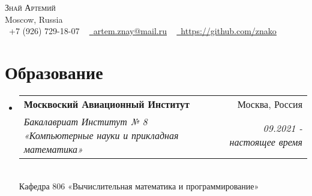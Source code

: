 \documentclass[letterpaper,10pt]{article}
\makeatletter
\newcommand{\resumeSubheading}[4]{
  \vspace{-1pt}\item
    \begin{tabular*}{0.97\textwidth}{l@{\extracolsep{\fill}}r}
      \textbf{#1} & \textcolor{mygray}{#2} \\
      \textit{\small#3} & \textcolor{mygray}{\textit{\small #4}} \\
    \end{tabular*}\vspace{-5pt}
}
\newcommand{\resumeSubHeadingListStart}{\begin{itemize}[leftmargin=*]}
\newcommand{\resumeSubHeadingListEnd}{\end{itemize}}
\makeatother
\begin{document}
\begin{center}
    {\huge \scshape Знай Артемий} \\ \vspace{1pt}
    Moscow, Russia \\ \vspace{2pt}
    \small \raisebox{-0.1\height}\faPhone\ +7 (926) 729-18-07 ~ \href{artem.znay@mail.ru}{\raisebox{-0.2\height}\faEnvelope\  \underline{artem.znay@mail.ru}} ~ 
    \href{https://github.com/znako}{\raisebox{-0.2\height}\faGithub\ \underline{https://github.com/znako}}
    \vspace{-8pt}
\end{center}


\section{Образование}
  \resumeSubHeadingListStart
    \resumeSubheading
       {Москвоский Авиационный Институт}{Москва, Россия}
      {Бакалавриат Институт № 8 «Компьютерные науки и прикладная математика»}{09.2021 - настоящее время}
      \\ \vspace{4pt}
      {Кафедра 806 «Вычислительная математика и программирование»}
      \\ \vspace{4pt}
  \resumeSubHeadingListEnd

\end{document}
